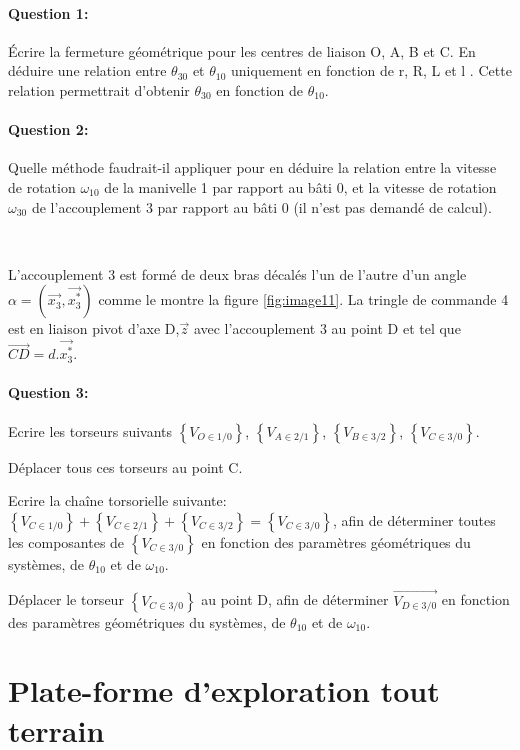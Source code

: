 \paragraph{Question 1:}
Écrire la fermeture géométrique pour les centres de liaison O, A, B et C.
En déduire une relation entre $\theta_{30}$ et $\theta_{10}$ uniquement en fonction de r, R, L et l . Cette relation permettrait d'obtenir $\theta_{30}$ en fonction de $\theta_{10}$.

\paragraph{Question 2:}

Quelle méthode faudrait-il appliquer pour en déduire la relation entre la vitesse
de rotation $\omega_{10}$ de la manivelle 1 par rapport au bâti 0, et la vitesse de rotation $\omega_{30}$ de l'accouplement 3 par rapport au bâti 0 (il n'est pas demandé de calcul).

~\

L'accouplement 3 est formé de deux bras décalés l'un de l'autre d'un angle $\alpha=(\overrightarrow{x_3},\overrightarrow{x_3^*})$ comme le montre la figure \ref{fig:image11}. La tringle de commande 4 est en liaison pivot d'axe D,$\overrightarrow{z}$ avec l'accouplement 3 au point D et tel que $\overrightarrow{CD}=d.\overrightarrow{x_3^*}$.

\paragraph{Question 3:}

Ecrire les torseurs suivants $\left\{V_{O\in 1/0}\right\}$, $\left\{V_{A\in 2/1}\right\}$, $\left\{V_{B\in 3/2}\right\}$, $\left\{V_{C\in 3/0}\right\}$.

Déplacer tous ces torseurs au point C.

Ecrire la chaîne torsorielle suivante: $\left\{V_{C\in 1/0}\right\}+\left\{V_{C\in 2/1}\right\}+\left\{V_{C\in 3/2}\right\}=\left\{V_{C\in 3/0}\right\}$, afin de déterminer toutes les composantes de $\left\{V_{C\in 3/0}\right\}$ en fonction des paramètres géométriques du systèmes, de $\theta_{10}$ et de $\omega_{10}$.

Déplacer le torseur $\left\{V_{C\in 3/0}\right\}$ au point D, afin de déterminer $\overrightarrow{V_{D\in 3/0}}$ en fonction des paramètres géométriques du systèmes, de $\theta_{10}$ et de $\omega_{10}$.

\newpage

\section{Plate-forme d'exploration tout terrain}

